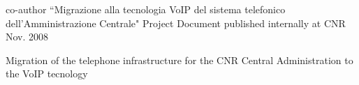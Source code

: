


\begin{cventries}


\cventry
{co-author} %
{“Migrazione alla tecnologia VoIP del sistema telefonico dell’Amministrazione Centrale"} %
{Project Document published internally at CNR} %
{Nov. 2008} %
{ %
\begin{cvitems}
\item {Migration of the telephone infrastructure for the CNR Central Administration to the VoIP tecnology}
\end{cvitems}
}



\end{cventries}